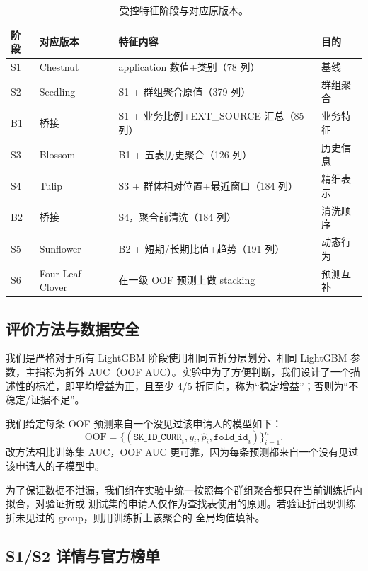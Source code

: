 \documentclass[12pt,UTF8,fontset=windows]{ctexart}
\begin{document}
\begin{table}[h]
\centering\footnotesize
\caption{受控特征阶段与对应原版本。}\label{tab:matrix}
\begin{tabular}{llp{}l}
\toprule
阶段 & 对应版本 & 特征内容 & 目的 \\
\midrule
S1   & Chestnut       & application 数值+类别（78 列） & 基线 \\
S2   & Seedling       & S1 + 群组聚合原值（379 列）    & 群组聚合 \\
B1   & 桥接           & S1 + 业务比例+EXT\_SOURCE 汇总（85 列） & 业务特征 \\
S3   & Blossom        & B1 + 五表历史聚合（126 列）     & 历史信息 \\
S4   & Tulip          & S3 + 群体相对位置+最近窗口（184 列） & 精细表示 \\
B2   & 桥接           & S4，聚合前清洗（184 列）        & 清洗顺序 \\
S5   & Sunflower      & B2 + 短期/长期比值+趋势（191 列）& 动态行为 \\
S6   & Four Leaf Clover & 在一级 OOF 预测上做 stacking & 预测互补 \\
\bottomrule
\end{tabular}
\end{table}

\subsection{评价方法与数据安全}

我们是严格对于所有 LightGBM 阶段使用相同五折分层划分、相同
LightGBM 参数，主指标为折外 AUC（OOF AUC）。实验中为了方便判断，我们设计了一个描述性的标准，即平均增益为正，且至少 4/5 折同向，称为“稳定增益”；否则为“不稳定/证据不足”。

我们给定每条 OOF 预测来自一个没见过该申请人的模型如下：
\[\text{OOF}=\{(\texttt{SK\_ID\_CURR}_i, y_i, \hat p_i, \texttt{fold\_id}_i)\}_{i=1}^{n}.\]
改方法相比训练集 AUC，OOF AUC 更可靠，因为每条预测都来自一个没有见过该申请人的子模型中。

为了保证数据不泄漏，我们组在实验中统一按照每个群组聚合都只在当前训练折内拟合，对验证折或
测试集的申请人仅作为查找表使用的原则。若验证折出现训练折未见过的 group，则用训练折上该聚合的
全局均值填补。

\subsection{S1/S2 详情与官方榜单}
\end{document}
